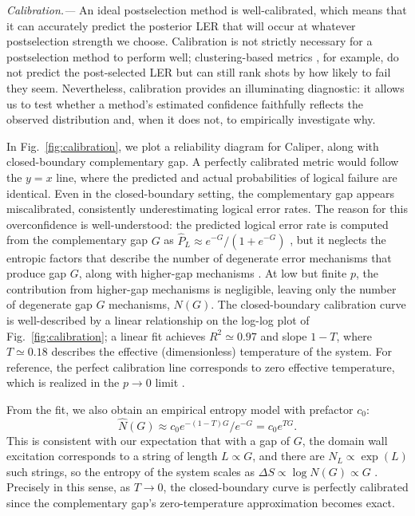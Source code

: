 \documentclass[
    reprint,
    amsmath,amssymb,
    nofootinbib,
    superscriptaddress,
    aps,
    noeprint,
    longbibliography,
    prl
]{revtex4-2}
\theoremstyle{plain}
\begin{document}
\textit{Calibration.---} An ideal postselection method is well-calibrated, which means that it can
accurately predict the posterior LER that will occur at whatever postselection strength we choose.
Calibration is not strictly necessary for a postselection method to perform well; clustering-based
metrics \cite{lee_efficient_2026}, for example, do not predict the post-selected LER but can still rank shots by how likely to
fail they seem. Nevertheless, calibration provides an illuminating diagnostic: it allows us to test
whether a method’s estimated confidence faithfully reflects the observed distribution and, when it
does not, to empirically investigate why.

In Fig.~\ref{fig:calibration}, we plot a reliability diagram for Caliper, along with closed-boundary
complementary gap. A perfectly calibrated metric would follow the $y=x$ line, where the predicted
and actual probabilities of logical failure are identical. Even in the closed-boundary setting, the
complementary gap appears miscalibrated, consistently underestimating logical error rates. The
reason for this overconfidence is well-understood: the predicted logical error rate is computed from
the complementary gap $G$ as $\hat P_L \approx e^{-G}/(1+e^{-G})$ \cite{gidney_yoked_2023, bombin_fault-tolerant_2024}, but it neglects the entropic factors
that describe the number of degenerate error mechanisms that produce gap $G$, along with higher-gap
mechanisms \cite{dennis_topological_2002, duclos-cianci_fast_2010}. At low but finite $p$, the contribution from higher-gap
mechanisms is negligible, leaving only the number of degenerate gap $G$ mechanisms, $N(G)$. The
closed-boundary calibration curve is well-described by a linear relationship on the log-log plot of
Fig.~\ref{fig:calibration}; a linear fit achieves $R^2 \simeq 0.97$ and slope $1-T$, where $T \simeq 0.18$
describes the effective (dimensionless) temperature of the system. For reference, the perfect calibration line corresponds to zero effective temperature, which is realized in the $p \rightarrow 0$ limit \cite{nishimori_internal_1981, dennis_topological_2002}.  

From the fit, we also obtain an empirical entropy model with prefactor $c_0$:
\begin{equation}
    \hat N(G) \approx c_0 e^{-(1-T)G}/e^{-G} = c_0 e^{TG}.
\end{equation}
This is consistent with our expectation that with a gap of $G$, the domain wall excitation
corresponds to a string of length $L\propto G$, and there are $N_L\propto \exp(L)$ such strings, so
the entropy of the system scales as $\Delta S \propto \log N(G) \propto G$ \cite{dennis_topological_2002}. Precisely in this sense,
as $T \rightarrow 0$, the closed-boundary curve is perfectly calibrated since the complementary
gap's zero-temperature approximation becomes exact.
\end{document}

